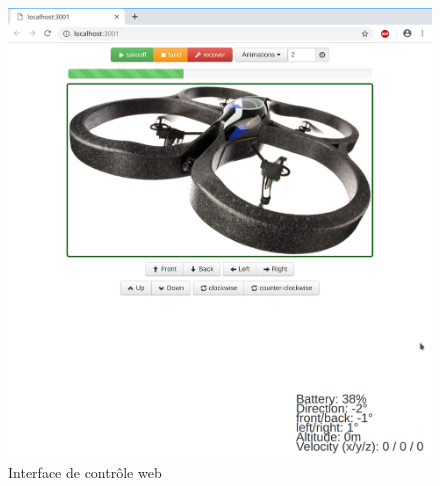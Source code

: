 \begin{figure}[!ht]
  \centering
  \includegraphics[scale=0.3]{images/control_application.png}
  \caption{Interface de contrôle web}
\end{figure}
